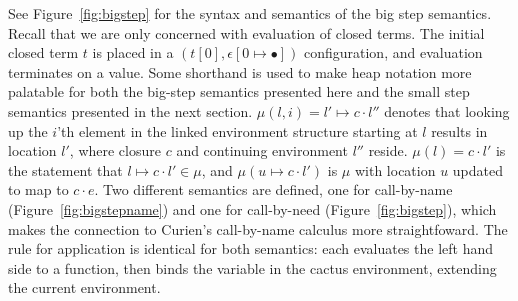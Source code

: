 See Figure~\ref{fig:bigstep} for the syntax and semantics of the \ce big step
semantics. Recall that we are only concerned with evaluation of closed terms.
The initial closed term $t$ is placed in a $(t[0],\epsilon[0 \mapsto \bullet])$
configuration, and evaluation terminates on a value. Some shorthand is used to
make heap notation more palatable for both the big-step semantics presented here
and the small step semantics presented in the next section. $\mu(l,i)=l' \mapsto
c \cdot l''$ denotes that looking up the $i$'th element in the linked
environment structure starting at $l$ results in location $l'$, where closure
$c$ and continuing environment $l''$ reside. $\mu(l) = c \cdot l'$ is the
statement that $l \mapsto c \cdot l' \in \mu$, and $\mu(u \mapsto c \cdot l')$
is $\mu$ with location $u$ updated to map to $c \cdot e$. Two 
different semantics are defined, one for call-by-name
(Figure~\ref{fig:bigstepname}) and one for call-by-need
(Figure~\ref{fig:bigstep}), which makes the connection to Curien's call-by-name
calculus more straightfoward. The rule for application is identical for both
semantics: each evaluates the left hand side to a function, then binds the
variable in the cactus environment, extending the current environment.

